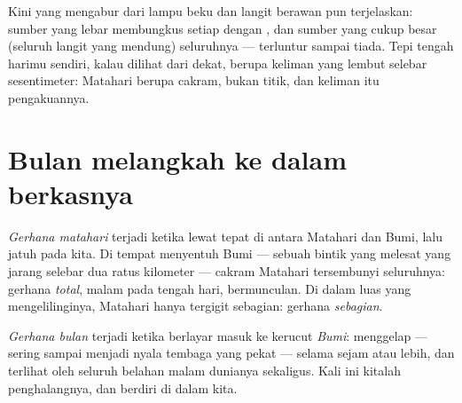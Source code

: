 \begin{example}\label{ex:g7:shadows-eclipses:soft}
Kini  yang mengabur dari lampu beku dan langit berawan
pun terjelaskan: sumber yang lebar membungkus setiap 
dengan , dan sumber yang cukup besar (seluruh langit yang
mendung) seluruhnya  ---  terluntur sampai
tiada. Tepi  tengah harimu sendiri, kalau dilihat dari
dekat, berupa keliman  yang lembut selebar sesentimeter:
Matahari berupa cakram, bukan titik, dan keliman itu pengakuannya.
\end{example}

\section{Bulan melangkah ke dalam berkasnya}

\begin{definition}\label{def:g7:shadows-eclipses:solar}
\emph{Gerhana matahari} terjadi ketika 
lewat tepat di antara Matahari dan Bumi, lalu  jatuh
pada kita. Di tempat \emph{}  menyentuh Bumi --- sebuah
bintik yang melesat yang jarang selebar dua ratus kilometer --- cakram
Matahari tersembunyi seluruhnya: gerhana \emph{total}, malam pada
tengah hari,  bermunculan. Di dalam \emph{} luas yang
mengelilinginya, Matahari hanya tergigit sebagian: gerhana
\emph{sebagian}.
\end{definition}

\begin{definition}\label{def:g7:shadows-eclipses:lunar}
\emph{Gerhana bulan} terjadi ketika \emph{}
berlayar masuk ke kerucut  \emph{Bumi}: 
menggelap --- sering sampai menjadi nyala tembaga yang pekat ---
selama sejam atau lebih, dan terlihat oleh seluruh belahan malam
dunianya sekaligus. Kali ini kitalah penghalangnya, dan  berdiri
di dalam  kita.
\end{definition}

